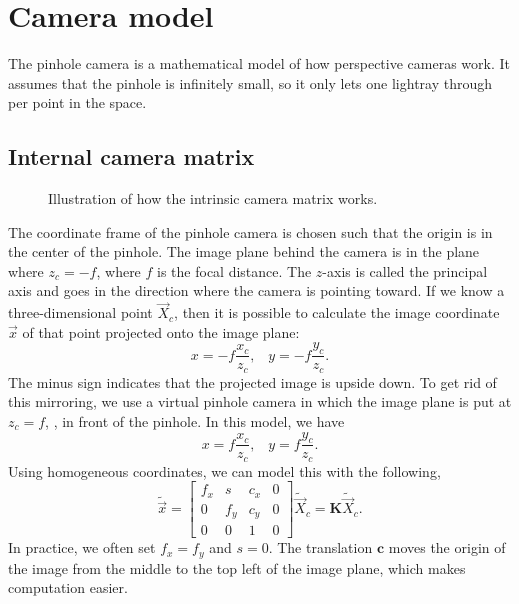 \section{Camera model} \label{sec:camera-model}

The pinhole camera is a mathematical model of how perspective cameras work.
It assumes that the pinhole is infinitely small, so it only lets one lightray
through per point in the space.

\subsection{Internal camera matrix}

\begin{figure}[ht]
    \centering
    \caption{Illustration of how the intrinsic camera matrix works.}
    \label{fig:internal-camera}
\end{figure}

The coordinate frame of the pinhole camera is chosen such that the origin is in
the center of the pinhole. The image plane behind the camera is in the plane
where $z_c=-f$, where $f$ is the focal distance. The $z$-axis is called the
principal axis and goes in the direction where the camera is pointing toward. If
we know a three-dimensional point $\vec{X}_c$, then it is possible to calculate
the image coordinate $\vec{x}$ of that point projected onto the image plane: \[
  x=-f\frac{x_c}{z_c}, \;\;\; y=-f\frac{y_c}{z_c}
.\]
The minus sign indicates that the projected image is upside down. To get rid of
this mirroring, we use a virtual pinhole camera in which the image plane is put
at $z_c=f$, \ie, in front of the pinhole. In this model, we have \[
  x=f\frac{x_c}{z_c}, \;\;\; y=f\frac{y_c}{z_c}
.\]
Using homogeneous coordinates, we can model this with the following, \[
  \tilde{\vec{x}} = \begin{bmatrix} f_x & s & c_x & 0 \\ 0 & f_y & c_y & 0 \\ 0
  & 0 & 1 & 0 \end{bmatrix}\tilde{\vec{X}}_c = \bm{K}\tilde{\vec{X}}_c
.\]
In practice, we often set $f_x=f_y$ and $s=0$. The translation $\bm{c}$ moves
the origin of the image from the middle to the top left of the image plane,
which makes computation easier.

